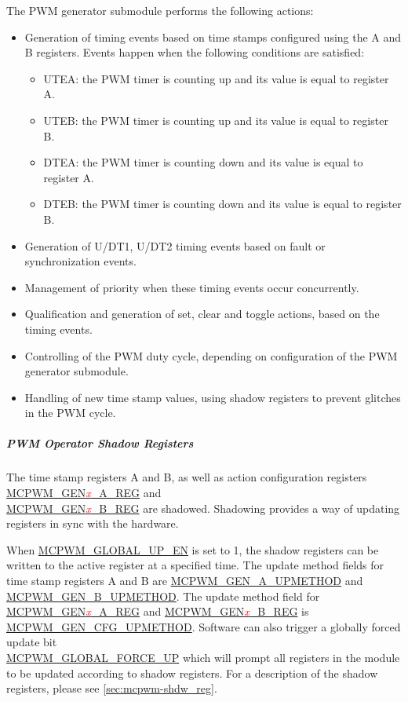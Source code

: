 \documentclass[main\_\_EN.tex]{subfiles}
\begin{document}
The PWM generator submodule performs the following actions:
\begin{itemize}
    \item Generation of timing events based on time stamps configured using the A and B registers. Events happen when the following conditions are satisfied:
    \begin{itemize}
        \item UTEA: the PWM timer is counting up and its value is equal to register A.
        \item UTEB: the PWM timer is counting up and its value is equal to register B.
        \item DTEA: the PWM timer is counting down and its value is equal to register A.
        \item DTEB: the PWM timer is counting down and its value is equal to register B.
    \end{itemize}
    \item Generation of U/DT1, U/DT2 timing events based on fault or synchronization events.
    \item Management of priority when these timing events occur concurrently.
    \item Qualification and generation of set, clear and toggle actions, based on the timing events.
    \item Controlling of the PWM duty cycle, depending on configuration of the PWM generator submodule.
    \item Handling of new time stamp values, using shadow registers to prevent glitches in the PWM cycle.
\end{itemize}

\subparagraph{PWM Operator Shadow Registers}
The time stamp registers A and B, as well as action configuration registers  \hyperref[regdesc:MCPWMGEN0AREG]{MCPWM\_GEN\textcolor{red}{\it{x}}\_A\_REG} and\\ \hyperref[regdesc:MCPWMGEN0BREG]{MCPWM\_GEN\textcolor{red}{\it{x}}\_B\_REG} are shadowed. Shadowing provides a way of updating registers in sync with the hardware.

When \hyperref[fielddesc:MCPWMGLOBALUPEN]{MCPWM\_GLOBAL\_UP\_EN} is set to 1, the shadow registers can be written to the active register at a specified time. The update method fields for time stamp registers A and B are \hyperref[fielddesc:MCPWMGEN0AUPMETHOD]{MCPWM\_GEN\_A\_UPMETHOD} and \hyperref[fielddesc:MCPWMGEN0BUPMETHOD]{MCPWM\_GEN\_B\_UPMETHOD}. The update method field for \hyperref[regdesc:MCPWMGEN0AREG]{MCPWM\_GEN\textcolor{red}{\it{x}}\_A\_REG} and \hyperref[regdesc:MCPWMGEN0BREG]{MCPWM\_GEN\textcolor{red}{\it{x}}\_B\_REG} is \hyperref[fielddesc:MCPWMGEN0CFGUPMETHOD]{MCPWM\_GEN\_CFG\_UPMETHOD}. Software can also trigger a globally forced update bit \\\hyperref[fielddesc:MCPWMGLOBALFORCEUP]{MCPWM\_GLOBAL\_FORCE\_UP} which will prompt all registers in the module to be updated according to shadow registers. For a description of the shadow registers, please see \ref{sec:mcpwm-shdw_reg}.
\end{document}
